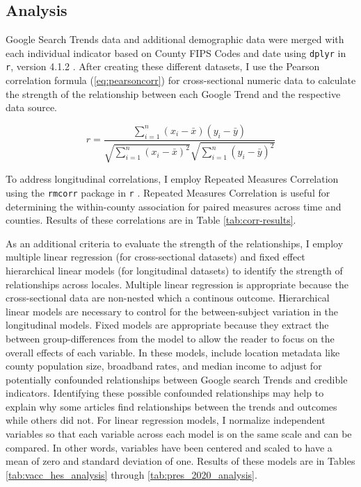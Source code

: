 
\subsection{Analysis}
Google Search Trends data and additional demographic data were merged with each
individual indicator based on County FIPS Codes and date using \texttt{dplyr} in \texttt{r},
version 4.1.2 \citep{tidyverse}. After creating these different datasets, I use the 
Pearson correlation formula (\eqref{eq:pearsoncorr}) for cross-sectional 
numeric data to calculate the strength of the relationship between each Google
Trend and the respective data source.

\begin{equation}
 r =
  \frac{ \sum_{i=1}^{n}(x_i-\bar{x})(y_i-\bar{y}) }{
        \sqrt{\sum_{i=1}^{n}(x_i-\bar{x})^2}\sqrt{\sum_{i=1}^{n}(y_i-\bar{y})^2}} \label{eq:pearsoncorr}
\end{equation}

To address longitudinal correlations, I employ Repeated Measures Correlation
using the \texttt{rmcorr} package in \texttt{r} \citep{bland1995, bakdash2017}. 
Repeated Measures Correlation is useful for determining the within-county
association for paired measures across time and counties. Results of these 
correlations are in Table \ref{tab:corr-results}.

As an additional criteria to evaluate the strength of the relationships, 
I employ multiple linear regression
(for cross-sectional datasets) and fixed effect hierarchical linear models
\citep{pinheiro_etal21} (for longitudinal datasets) to identify the strength of
relationships across locales. Multiple linear regression is appropriate because 
the cross-sectional data are non-nested which a continous outcome. Hierarchical
linear models are necessary to control for the between-subject variation 
in the longitudinal models. Fixed models are appropriate because 
they extract the between group-differences from the model to allow the reader to 
focus on the overall effects of each variable. 
In these models, include location metadata like county population size,
broadband rates, and median income to adjust for potentially
confounded relationships between Google search Trends and credible
indicators. Identifying these possible confounded relationships may help to
explain why some articles find relationships between the trends and outcomes
while others did not.
For linear regression models, I normalize independent
variables so that each variable across each model is on the same scale and can be compared. 
In other words, variables have been centered and scaled to have a mean of zero and
standard deviation of one. Results of these models are in Tables \ref{tab:vacc_hes_analysis} through \ref{tab:pres_2020_analysis}.

